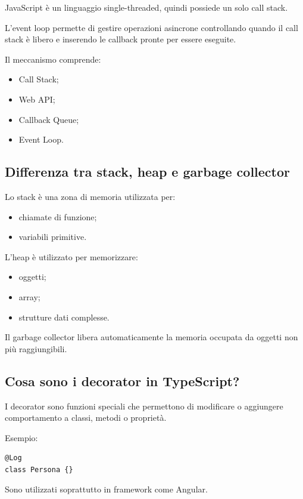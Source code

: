 \documentclass[12pt]{article}
\begin{document}
JavaScript è un linguaggio single-threaded, quindi possiede un solo call stack.

L'event loop permette di gestire operazioni asincrone controllando quando il call stack è libero e inserendo le callback pronte per essere eseguite.

Il meccanismo comprende:

\begin{itemize}
    \item Call Stack;
    \item Web API;
    \item Callback Queue;
    \item Event Loop.
\end{itemize}


\subsection{Differenza tra stack, heap e garbage collector}

Lo stack è una zona di memoria utilizzata per:

\begin{itemize}
    \item chiamate di funzione;
    \item variabili primitive.
\end{itemize}

L'heap è utilizzato per memorizzare:

\begin{itemize}
    \item oggetti;
    \item array;
    \item strutture dati complesse.
\end{itemize}

Il garbage collector libera automaticamente la memoria occupata da oggetti non più raggiungibili.


\subsection{Cosa sono i decorator in TypeScript?}

I decorator sono funzioni speciali che permettono di modificare o aggiungere comportamento a classi, metodi o proprietà.

Esempio:

\begin{verbatim}
@Log
class Persona {}
\end{verbatim}

Sono utilizzati soprattutto in framework come Angular.
\end{document}
